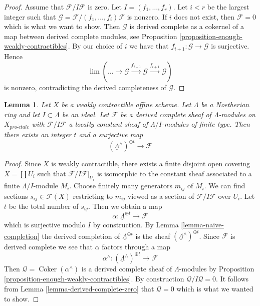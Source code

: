 \documentclass[10pt,a4paper]{article}
\theoremstyle{plain}
\newtheorem{lemma}[subsection]{Lemma}
\theoremstyle{definition}
\theoremstyle{remark}
\numberwithin{equation}{subsection}
\def\lim{\mathop{\mathrm{lim}}\nolimits}
\def\proetale{{pro\text{-}\acute{e}tale}}
\def\Coker{\mathop{\mathrm{Coker}}}
\begin{document}
\begin{proof}
Assume that $\mathcal{F}/I\mathcal{F}$ is zero.
Let $I = (f_1, \ldots, f_r)$. Let $i < r$ be the largest
integer such that $\mathcal{G} = \mathcal{F}/(f_1, \ldots, f_i)\mathcal{F}$
is nonzero. If $i$ does not exist, then $\mathcal{F} = 0$ which is what we
want to show. Then $\mathcal{G}$ is derived complete as a cokernel
of a map between derived complete modules, see
Proposition \ref{proposition-enough-weakly-contractibles}.
By our choice of $i$ we have that $f_{i + 1} : \mathcal{G} \to \mathcal{G}$
is surjective. Hence
$$
\lim (\ldots \to \mathcal{G} \xrightarrow{f_{i + 1}} \mathcal{G}
\xrightarrow{f_{i + 1}} \mathcal{G})
$$
is nonzero, contradicting the derived completeness of $\mathcal{G}$.
\end{proof}

\begin{lemma}
\label{lemma-derived-complete-limit}
Let $X$ be a weakly contractible affine scheme.
Let $\Lambda$ be a Noetherian ring and let $I \subset \Lambda$ be an ideal.
Let $\mathcal{F}$ be a derived complete sheaf of $\Lambda$-modules
on $X_\proetale$ with $\mathcal{F}/I\mathcal{F}$ a locally
constant sheaf of $\Lambda/I$-modules of finite type.
Then there exists an integer $t$ and a surjective map
$$
(\underline{\Lambda}^\wedge)^{\oplus t} \to \mathcal{F}
$$
\end{lemma}

\begin{proof}
Since $X$ is weakly contractible, there exists a finite disjoint open
covering $X = \coprod U_i$ such that $\mathcal{F}/I\mathcal{F}|_{U_i}$
is isomorphic to the constant sheaf associated to a finite $\Lambda/I$-module
$M_i$. Choose finitely many generators $m_{ij}$ of $M_i$. We
can find sections $s_{ij} \in \mathcal{F}(X)$ restricting to
$m_{ij}$ viewed as a section of $\mathcal{F}/I\mathcal{F}$ over $U_i$. 
Let $t$ be the total number of $s_{ij}$. Then we obtain a map
$$
\alpha : \underline{\Lambda}^{\oplus t} \longrightarrow \mathcal{F}
$$
which is surjective modulo $I$ by construction. By
Lemma \ref{lemma-naive-completion}
the derived completion of $\underline{\Lambda}^{\oplus t}$ is the
sheaf $(\underline{\Lambda}^\wedge)^{\oplus t}$. Since $\mathcal{F}$
is derived complete we see that $\alpha$ factors through a map
$$
\alpha^\wedge :
(\underline{\Lambda}^\wedge)^{\oplus t}
\longrightarrow
\mathcal{F}
$$
Then $\mathcal{Q} = \Coker(\alpha^\wedge)$ is a derived complete
sheaf of $\Lambda$-modules by
Proposition \ref{proposition-enough-weakly-contractibles}.
By construction $\mathcal{Q}/I\mathcal{Q} = 0$. It follows from
Lemma \ref{lemma-derived-complete-zero}
that $\mathcal{Q} = 0$ which is what we wanted to show.
\end{proof}
\end{document}
